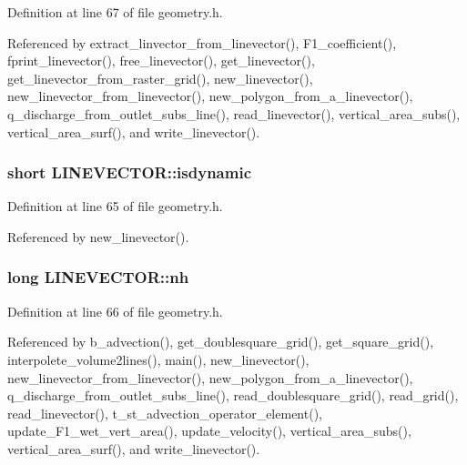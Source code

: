 Definition at line 67 of file geometry.\-h.



Referenced by extract\-\_\-linvector\-\_\-from\-\_\-linevector(), F1\-\_\-coefficient(), fprint\-\_\-linevector(), free\-\_\-linevector(), get\-\_\-linevector(), get\-\_\-linevector\-\_\-from\-\_\-raster\-\_\-grid(), new\-\_\-linevector(), new\-\_\-linevector\-\_\-from\-\_\-linevector(), new\-\_\-polygon\-\_\-from\-\_\-a\-\_\-linevector(), q\-\_\-discharge\-\_\-from\-\_\-outlet\-\_\-subs\-\_\-line(), read\-\_\-linevector(), vertical\-\_\-area\-\_\-subs(), vertical\-\_\-area\-\_\-surf(), and write\-\_\-linevector().

\hypertarget{struct_l_i_n_e_v_e_c_t_o_r_a33feddd10e0eed4361868db7a1a47560}{
\subsubsection[{isdynamic}]{\setlength{\rightskip}{0pt plus 5cm}short L\-I\-N\-E\-V\-E\-C\-T\-O\-R\-::isdynamic}}\label{struct_l_i_n_e_v_e_c_t_o_r_a33feddd10e0eed4361868db7a1a47560}


Definition at line 65 of file geometry.\-h.



Referenced by new\-\_\-linevector().

\hypertarget{struct_l_i_n_e_v_e_c_t_o_r_a6b62904566645678ab4eea2b1cc53f32}{
\subsubsection[{nh}]{\setlength{\rightskip}{0pt plus 5cm}long L\-I\-N\-E\-V\-E\-C\-T\-O\-R\-::nh}}\label{struct_l_i_n_e_v_e_c_t_o_r_a6b62904566645678ab4eea2b1cc53f32}


Definition at line 66 of file geometry.\-h.



Referenced by b\-\_\-advection(), get\-\_\-doublesquare\-\_\-grid(), get\-\_\-square\-\_\-grid(), interpolete\-\_\-volume2lines(), main(), new\-\_\-linevector(), new\-\_\-linevector\-\_\-from\-\_\-linevector(), new\-\_\-polygon\-\_\-from\-\_\-a\-\_\-linevector(), q\-\_\-discharge\-\_\-from\-\_\-outlet\-\_\-subs\-\_\-line(), read\-\_\-doublesquare\-\_\-grid(), read\-\_\-grid(), read\-\_\-linevector(), t\-\_\-st\-\_\-advection\-\_\-operator\-\_\-element(), update\-\_\-\-F1\-\_\-wet\-\_\-vert\-\_\-area(), update\-\_\-velocity(), vertical\-\_\-area\-\_\-subs(), vertical\-\_\-area\-\_\-surf(), and write\-\_\-linevector().

